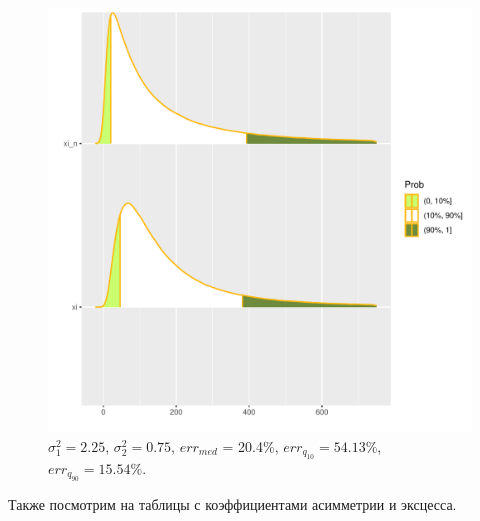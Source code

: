 \documentclass[12pt]{article}
\begin{document}
\begin{figure}[!hhh]
	\begin{center}
		\begin{minipage}[h]{0.95\linewidth}
			\includegraphics[width=1\linewidth]{img/sr2.pdf}
			\caption{$\sigma_{1}^{2} = 2.25$, $\sigma_{2}^{2} = 0.75$, $err_{med}$ = 20.4\%,  $err_{q_{10}} = 54.13\%$,  $err_{q_{90}} = 15.54\%$. } %
			\label{ris6} %
		\end{minipage}
		
	\end{center}
\end{figure}

Также посмотрим на таблицы с коэффициентами асимметрии и эксцесса.
\end{document}
